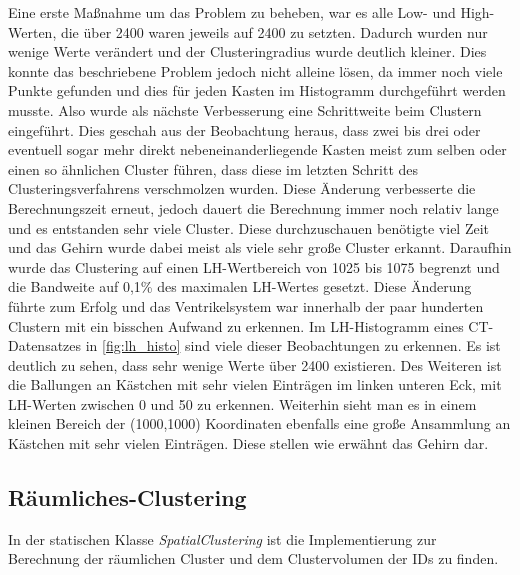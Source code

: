 Eine erste Maßnahme um das Problem zu beheben, war es alle Low- und High- Werten, die über 2400 waren jeweils auf 2400 zu setzten. Dadurch wurden nur wenige Werte verändert und der Clusteringradius wurde deutlich kleiner. Dies konnte das beschriebene Problem jedoch nicht alleine lösen, da immer noch viele Punkte gefunden und dies für jeden Kasten im Histogramm durchgeführt werden musste.
\newline
Also wurde als nächste Verbesserung eine Schrittweite beim Clustern eingeführt. Dies geschah aus der Beobachtung heraus, dass zwei bis drei oder eventuell sogar mehr direkt nebeneinanderliegende Kasten meist zum selben oder einen so ähnlichen Cluster führen, dass diese im letzten Schritt des Clusteringsverfahrens verschmolzen wurden. Diese Änderung verbesserte die Berechnungszeit erneut, jedoch  dauert die Berechnung immer noch relativ lange und es entstanden sehr viele Cluster. Diese durchzuschauen benötigte viel Zeit und das Gehirn wurde dabei meist als viele sehr große Cluster erkannt.
\newline
Daraufhin wurde das Clustering auf einen LH-Wertbereich von 1025 bis 1075 begrenzt und die Bandweite auf 0,1\% des maximalen LH-Wertes gesetzt. Diese Änderung führte zum Erfolg und das Ventrikelsystem war innerhalb der paar hunderten Clustern mit ein bisschen Aufwand zu erkennen.
\newline
{}
Im LH-Histogramm eines CT-Datensatzes in \autoref{fig:lh_histo} sind viele dieser Beobachtungen zu erkennen. Es ist deutlich zu sehen, dass sehr wenige Werte über 2400 existieren. Des Weiteren ist die Ballungen an Kästchen mit sehr vielen Einträgen im linken unteren Eck, mit LH-Werten zwischen  0 und 50 zu erkennen. Weiterhin sieht man es in einem kleinen Bereich der (1000,1000) Koordinaten ebenfalls eine große Ansammlung an  Kästchen mit  sehr vielen Einträgen. Diese stellen wie erwähnt das Gehirn dar.

\subsection{Räumliches-Clustering}

In der statischen Klasse \textit{SpatialClustering} ist die Implementierung zur Berechnung der räumlichen Cluster und dem Clustervolumen der IDs zu finden.


